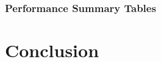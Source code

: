 \documentclass{article}
\begin{document}




\subsubsection{Performance Summary Tables}




\section{Conclusion}



\end{document}
